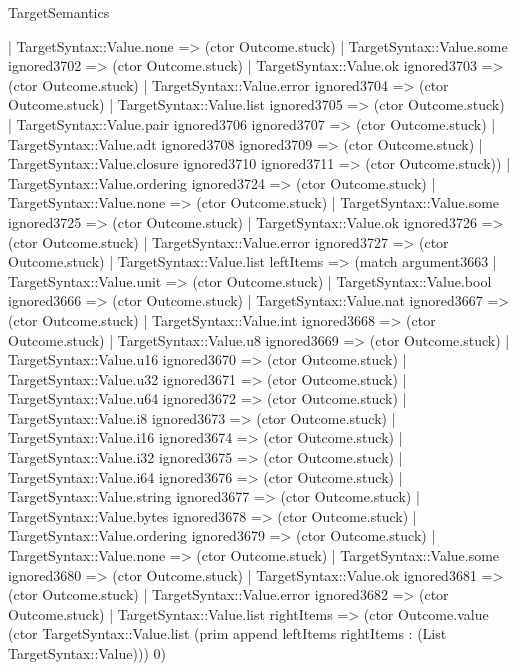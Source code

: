 \begin{lexlean}{TargetSemantics}
\begin{semanticmodule}
{              | TargetSyntax::Value.none => (ctor Outcome.stuck)
              | TargetSyntax::Value.some ignored3702 => (ctor Outcome.stuck)
              | TargetSyntax::Value.ok ignored3703 => (ctor Outcome.stuck)
              | TargetSyntax::Value.error ignored3704 => (ctor Outcome.stuck)
              | TargetSyntax::Value.list ignored3705 => (ctor Outcome.stuck)
              | TargetSyntax::Value.pair ignored3706 ignored3707 => (ctor Outcome.stuck)
              | TargetSyntax::Value.adt ignored3708 ignored3709 => (ctor Outcome.stuck)
              | TargetSyntax::Value.closure ignored3710 ignored3711 => (ctor Outcome.stuck))
            | TargetSyntax::Value.ordering ignored3724 => (ctor Outcome.stuck)
            | TargetSyntax::Value.none => (ctor Outcome.stuck)
            | TargetSyntax::Value.some ignored3725 => (ctor Outcome.stuck)
            | TargetSyntax::Value.ok ignored3726 => (ctor Outcome.stuck)
            | TargetSyntax::Value.error ignored3727 => (ctor Outcome.stuck)
            | TargetSyntax::Value.list leftItems => (match argument3663
              | TargetSyntax::Value.unit => (ctor Outcome.stuck)
              | TargetSyntax::Value.bool ignored3666 => (ctor Outcome.stuck)
              | TargetSyntax::Value.nat ignored3667 => (ctor Outcome.stuck)
              | TargetSyntax::Value.int ignored3668 => (ctor Outcome.stuck)
              | TargetSyntax::Value.u8 ignored3669 => (ctor Outcome.stuck)
              | TargetSyntax::Value.u16 ignored3670 => (ctor Outcome.stuck)
              | TargetSyntax::Value.u32 ignored3671 => (ctor Outcome.stuck)
              | TargetSyntax::Value.u64 ignored3672 => (ctor Outcome.stuck)
              | TargetSyntax::Value.i8 ignored3673 => (ctor Outcome.stuck)
              | TargetSyntax::Value.i16 ignored3674 => (ctor Outcome.stuck)
              | TargetSyntax::Value.i32 ignored3675 => (ctor Outcome.stuck)
              | TargetSyntax::Value.i64 ignored3676 => (ctor Outcome.stuck)
              | TargetSyntax::Value.string ignored3677 => (ctor Outcome.stuck)
              | TargetSyntax::Value.bytes ignored3678 => (ctor Outcome.stuck)
              | TargetSyntax::Value.ordering ignored3679 => (ctor Outcome.stuck)
              | TargetSyntax::Value.none => (ctor Outcome.stuck)
              | TargetSyntax::Value.some ignored3680 => (ctor Outcome.stuck)
              | TargetSyntax::Value.ok ignored3681 => (ctor Outcome.stuck)
              | TargetSyntax::Value.error ignored3682 => (ctor Outcome.stuck)
              | TargetSyntax::Value.list rightItems => (ctor Outcome.value (ctor TargetSyntax::Value.list (prim append leftItems rightItems : (List TargetSyntax::Value))) 0)
}
\end{semanticmodule}
\end{lexlean}
